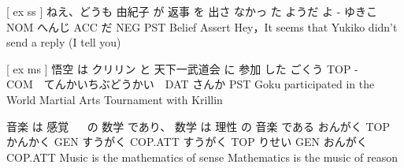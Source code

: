 [ ex ss ]
ねえ、どうも 由紀子 が  返事   を  出さ なかっ た ようだ  よ
-           ゆきこ NOM へんじ ACC  だ   NEG  PST Belief Assert
Hey，It seems that Yukiko didn't send a reply (I tell you)

[ ex ms ]
悟空   は  クリリン と    天下一武道会         に   参加 した
ごくう TOP -　　　　COM　てんかいちぶどうかい　DAT さんか PST
Goku participated in the World Martial Arts Tournament with Krillin

音楽    は   感覚 　 の   数学    であり、  数学    は  理性   の  音楽    である
おんがく TOP かんかく GEN すうがく COP.ATT すうがく TOP りせい GEN おんがく COP.ATT
Music is the mathematics of sense
Mathematics is the music of reason
